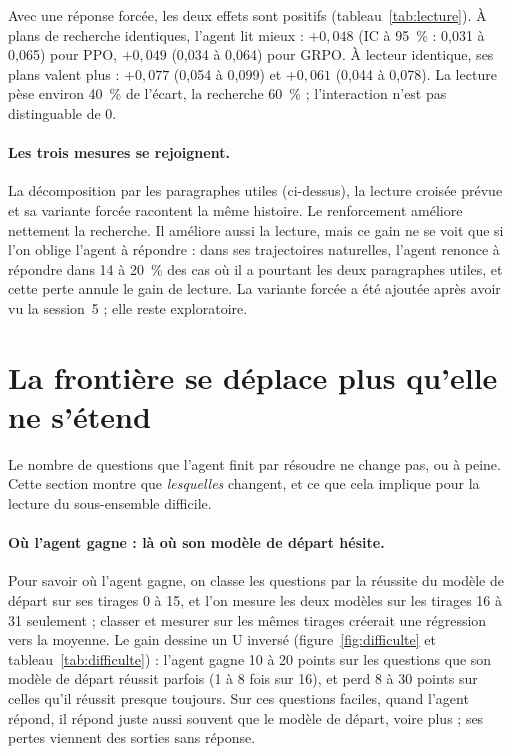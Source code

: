Avec une réponse forcée, les deux effets sont positifs (tableau~\ref{tab:lecture}). À plans de recherche identiques, l'agent lit mieux : $+0{,}048$ (IC à 95~\% : 0,031 à 0,065) pour PPO, $+0{,}049$ (0,034 à 0,064) pour GRPO. À lecteur identique, ses plans valent plus : $+0{,}077$ (0,054 à 0,099) et $+0{,}061$ (0,044 à 0,078). La lecture pèse environ 40~\% de l'écart, la recherche 60~\% ; l'interaction n'est pas distinguable de 0.

\paragraph{Les trois mesures se rejoignent.} La décomposition par les paragraphes utiles (ci-dessus), la lecture croisée prévue et sa variante forcée racontent la même histoire. Le renforcement améliore nettement la recherche. Il améliore aussi la lecture, mais ce gain ne se voit que si l'on oblige l'agent à répondre : dans ses trajectoires naturelles, l'agent renonce à répondre dans 14 à 20~\% des cas où il a pourtant les deux paragraphes utiles, et cette perte annule le gain de lecture. La variante forcée a été ajoutée après avoir vu la session~5 ; elle reste exploratoire.



\section{La frontière se déplace plus qu'elle ne s'étend}\label{sec:frontiere-p2}

Le nombre de questions que l'agent finit par résoudre ne change pas, ou à peine. Cette section montre que \emph{lesquelles} changent, et ce que cela implique pour la lecture du sous-ensemble difficile.

\paragraph{Où l'agent gagne : là où son modèle de départ hésite.} Pour savoir où l'agent gagne, on classe les questions par la réussite du modèle de départ sur ses tirages 0 à 15, et l'on mesure les deux modèles sur les tirages 16 à 31 seulement ; classer et mesurer sur les mêmes tirages créerait une régression vers la moyenne. Le gain dessine un U inversé (figure~\ref{fig:difficulte} et tableau~\ref{tab:difficulte}) : l'agent gagne 10 à 20 points sur les questions que son modèle de départ réussit parfois (1 à 8 fois sur 16), et perd 8 à 30 points sur celles qu'il réussit presque toujours. Sur ces questions faciles, quand l'agent répond, il répond juste aussi souvent que le modèle de départ, voire plus ; ses pertes viennent des sorties sans réponse.

